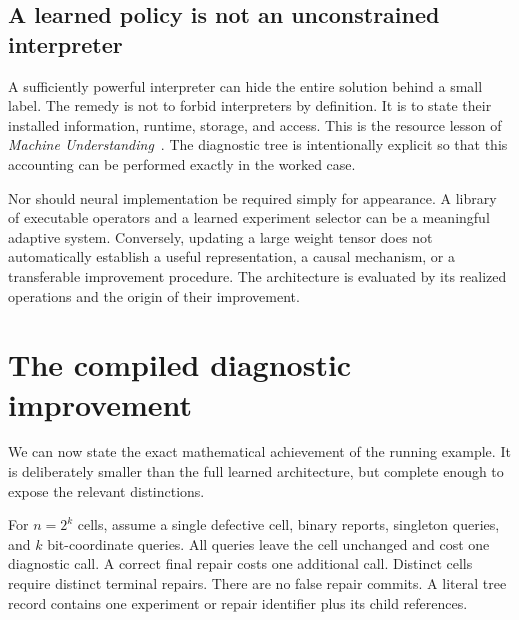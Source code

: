 \subsection{A learned policy is not an unconstrained interpreter}
A sufficiently powerful interpreter can hide the entire solution behind a small label. The remedy is not to forbid interpreters by definition. It is to state their installed information, runtime, storage, and access. This is the resource lesson of \emph{Machine Understanding}~\cite{SII:understanding}. The diagnostic tree is intentionally explicit so that this accounting can be performed exactly in the worked case.

Nor should neural implementation be required simply for appearance. A library of executable operators and a learned experiment selector can be a meaningful adaptive system. Conversely, updating a large weight tensor does not automatically establish a useful representation, a causal mechanism, or a transferable improvement procedure. The architecture is evaluated by its realized operations and the origin of their improvement.

\section{The compiled diagnostic improvement}\label{SII:sec:worked}
We can now state the exact mathematical achievement of the running example. It is deliberately smaller than the full learned architecture, but complete enough to expose the relevant distinctions.

For $n=2^k$ cells, assume a single defective cell, binary reports, singleton queries, and $k$ bit-coordinate queries. All queries leave the cell unchanged and cost one diagnostic call. A correct final repair costs one additional call. Distinct cells require distinct terminal repairs. There are no false repair commits. A literal tree record contains one experiment or repair identifier plus its child references.

